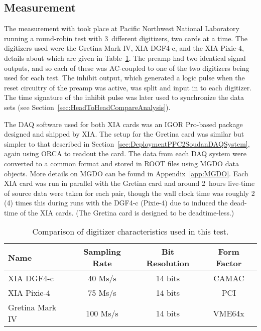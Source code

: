 		\subsection{Measurement}
	     	\label{sec:HeadToHeadCompareMeasurement}     
	The measurement with  took place at Pacific Northwest National Laboratory running a round-robin test with 3~different digitizers, two cards at a time.  The digitizers used were the Gretina Mark IV, XIA DGF4-c, and the XIA Pixie-4, details about which are given in Table~\ref{tab:HeadToHeadComparisonDetectorChars}.  The  preamp had two identical signal outputs, and so each of these was AC-coupled to one of the two digitizers being used for each test.  The inhibit output, which generated a logic pulse when the reset circuitry of the preamp was active, was split and input in to each digitizer.  The time signature of the inhibit pulse was later used to synchronize the data sets (see Section~\ref{sec:HeadToHeadCompareAnalysis}).  
	
	The DAQ software used for both XIA cards was an IGOR Pro-based package designed and shipped by XIA.  	The setup for the Gretina card was similar but simpler to that described in Section~\ref{sec:DeploymentPPC2SoudanDAQSystem}, again using ORCA to readout the card.  The data from each DAQ system were converted to a common format and stored in ROOT files using MGDO data objects.  More details on MGDO can be found in Appendix~\ref{app:MGDO}.  Each XIA card was run in parallel with the Gretina card and around 2~hours live-time of source data were taken for each pair, though the wall clock time was roughly 2 (4) times this during runs with the DGF4-c (Pixie-4) due to induced the dead-time of the XIA cards.  (The Gretina card is designed to be deadtime-less.)  
		
			\begin{table}
				\centering
				\begin{tabular}{l|c|c|c}
					Name & Sampling Rate & Bit Resolution & Form Factor \\
					\hline
					XIA DGF4-c & 40 Ms/s & 14 bits & CAMAC \\
					\hline
					XIA Pixie-4 &  75 Ms/s & 14 bits & PCI \\
					\hline
					Gretina Mark IV &  100 Ms/s & 14 bits & VME64x \\										
					\hline					
				\end{tabular}
				\caption[Comparison of digitizer characteristics]
				{Comparison of digitizer characteristics used in this test.}
				\label{tab:HeadToHeadComparisonDetectorChars}
			\end{table}	
		
